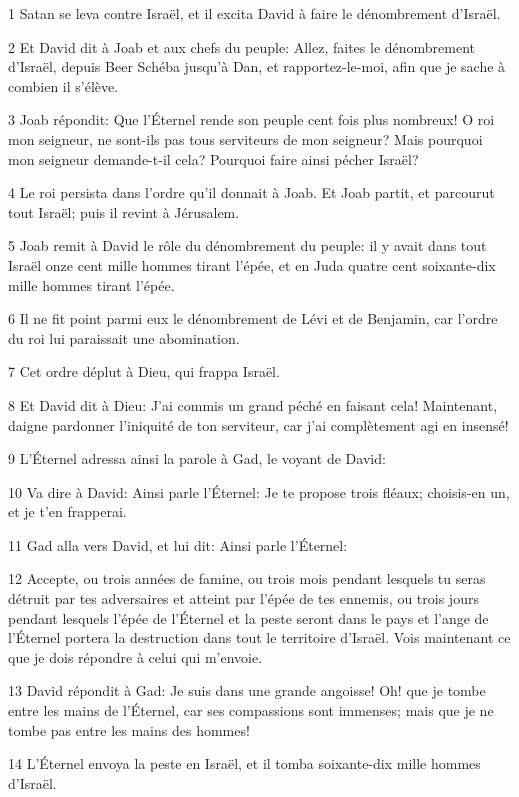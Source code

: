 \par 1 Satan se leva contre Israël, et il excita David à faire le dénombrement d'Israël.
\par 2 Et David dit à Joab et aux chefs du peuple: Allez, faites le dénombrement d'Israël, depuis Beer Schéba jusqu'à Dan, et rapportez-le-moi, afin que je sache à combien il s'élève.
\par 3 Joab répondit: Que l'Éternel rende son peuple cent fois plus nombreux! O roi mon seigneur, ne sont-ils pas tous serviteurs de mon seigneur? Mais pourquoi mon seigneur demande-t-il cela? Pourquoi faire ainsi pécher Israël?
\par 4 Le roi persista dans l'ordre qu'il donnait à Joab. Et Joab partit, et parcourut tout Israël; puis il revint à Jérusalem.
\par 5 Joab remit à David le rôle du dénombrement du peuple: il y avait dans tout Israël onze cent mille hommes tirant l'épée, et en Juda quatre cent soixante-dix mille hommes tirant l'épée.
\par 6 Il ne fit point parmi eux le dénombrement de Lévi et de Benjamin, car l'ordre du roi lui paraissait une abomination.
\par 7 Cet ordre déplut à Dieu, qui frappa Israël.
\par 8 Et David dit à Dieu: J'ai commis un grand péché en faisant cela! Maintenant, daigne pardonner l'iniquité de ton serviteur, car j'ai complètement agi en insensé!
\par 9 L'Éternel adressa ainsi la parole à Gad, le voyant de David:
\par 10 Va dire à David: Ainsi parle l'Éternel: Je te propose trois fléaux; choisis-en un, et je t'en frapperai.
\par 11 Gad alla vers David, et lui dit: Ainsi parle l'Éternel:
\par 12 Accepte, ou trois années de famine, ou trois mois pendant lesquels tu seras détruit par tes adversaires et atteint par l'épée de tes ennemis, ou trois jours pendant lesquels l'épée de l'Éternel et la peste seront dans le pays et l'ange de l'Éternel portera la destruction dans tout le territoire d'Israël. Vois maintenant ce que je dois répondre à celui qui m'envoie.
\par 13 David répondit à Gad: Je suis dans une grande angoisse! Oh! que je tombe entre les mains de l'Éternel, car ses compassions sont immenses; mais que je ne tombe pas entre les mains des hommes!
\par 14 L'Éternel envoya la peste en Israël, et il tomba soixante-dix mille hommes d'Israël.
